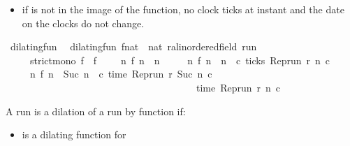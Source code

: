 \begin{isabellebody}
\begin{isamarkuptext}
\begin{itemize}
\item if  is not in the image of the function, no clock ticks at 
instant  and the date on the clocks do not change.%
\end{itemize}%
\end{isamarkuptext}\isamarkuptrue%
\isamarkupfalse%
\ dilating{\isacharunderscore}fun\isanewline
{}\isanewline
\ \ {\isacartoucheopen}dilating{\isacharunderscore}fun\ {\isacharparenleft}f{\isacharcolon}{\isacharcolon}nat\ {\isasymRightarrow}\ nat{\isacharparenright}\ {\isacharparenleft}r{\isacharcolon}{\isacharcolon}{\isacharprime}a{\isacharcolon}{\isacharcolon}linordered{\isacharunderscore}field\ run{\isacharparenright}\isanewline
\ \ \ \ {\isasymequiv}\ strict{\isacharunderscore}mono\ f\ {\isasymand}\ {\isacharparenleft}f\ {}\ {\isacharequal}\ {}{\isacharparenright}\ {\isasymand}\ {\isacharparenleft}{\isasymforall}n{\isachardot}\ f\ n\ {\isasymge}\ n\isanewline
\ \ \ \ {\isasymand}\ {\isacharparenleft}{\isacharparenleft}{\isasymnexists}n\ f\ n\ {\isacharequal}\ n{\isacharparenright}\ {\isasymlongrightarrow}\ {\isacharparenleft}{\isasymforall}c{\isachardot}\ {\isasymnot}{\isacharparenleft}ticks\ {\isacharparenleft}{\isacharparenleft}Rep{\isacharunderscore}run\ r{\isacharparenright}\ n\ c{\isacharparenright}{\isacharparenright}{\isacharparenright}{\isacharparenright}\isanewline
\ \ \ \ {\isasymand}\ {\isacharparenleft}{\isacharparenleft}{\isasymnexists}n\ f\ n\ {\isacharequal}\ {\isacharparenleft}Suc\ n{\isacharparenright}{\isacharparenright}\ {\isasymlongrightarrow}\ {\isacharparenleft}{\isasymforall}c{\isachardot}\ time\ {\isacharparenleft}{\isacharparenleft}Rep{\isacharunderscore}run\ r{\isacharparenright}\ {\isacharparenleft}Suc\ n{\isacharparenright}\ c{\isacharparenright}\isanewline
\ \ \ \ \ \ \ \ \ \ \ \ \ \ \ \ \ \ \ \ \ \ \ \ \ \ \ \ \ \ \ \ \ \ \ \ \ \ {\isacharequal}\ time\ {\isacharparenleft}{\isacharparenleft}Rep{\isacharunderscore}run\ r{\isacharparenright}\ n\ c{\isacharparenright}{\isacharparenright}{\isacharparenright}\isanewline
\ \ \ {\isacharparenright}{\isacartoucheclose}%
\begin{isamarkuptext}%
A run  is a dilation of a run  by 
function  if:

%
\begin{itemize}%
\item {} is a dilating function for  


\end{itemize}
\end{isamarkuptext}
\end{isabellebody}
